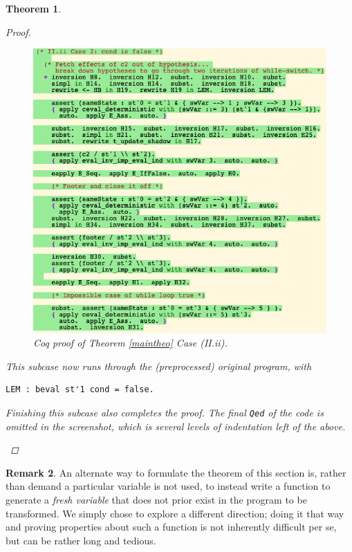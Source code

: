 \documentclass[12pt,notitlepage]{report}
\theoremstyle{plain}
\newtheorem{theo}{Theorem}[section]
\theoremstyle{definition}
\newtheorem{rem}[theo]{Remark}
\numberwithin{equation}{section}
\begin{document}
\begin{theo}
\begin{proof}
\begin{itemize}
\begin{itemize}
                \noindent\begin{figure}[H]
        \centering
        \includegraphics[scale=0.6]{alltrans_2_2}
        \caption{Coq proof of Theorem \ref{maintheo} Case (II.ii).}
        \label{fig:maintheo22}
        \end{figure}
                
                This subcase now runs through the (preprocessed) original program, with
                \begin{verbatim}LEM : beval st'1 cond = false.\end{verbatim}
                Finishing this subcase also completes the proof.  The final \verb$Qed$ of the code is omitted in the screenshot, which is several levels of indentation left of the above.\qedhere
            \end{itemize}
    \end{itemize}
\end{proof}
\end{theo}

\begin{rem}
    An alternate way to formulate the theorem of this section is, rather than demand a particular variable is not used, to instead write a function to generate a \emph{fresh variable} that does not prior exist in the program to be transformed.  We simply chose to explore a different direction; doing it that way and proving properties about such a function is not inherently difficult per se, but can be rather long and tedious. 
\end{rem}
\end{document}

